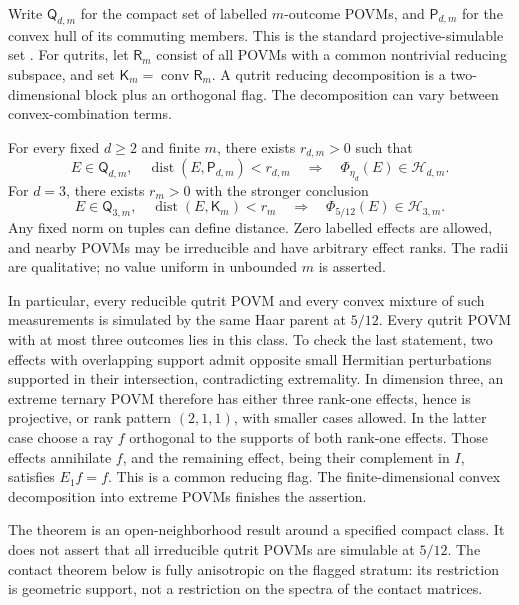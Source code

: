 Write \(\mathsf Q_{d,m}\) for the compact set of labelled \(m\)-outcome
POVMs, and \(\mathsf P_{d,m}\) for the convex hull of its commuting
members. This is the standard projective-simulable set
\cite{geo_oszmaniec2017}.
For qutrits, let \(\mathsf R_m\) consist of all POVMs with a common
nontrivial reducing subspace, and set
\(\mathsf K_m=\operatorname{conv}\mathsf R_m\). A qutrit reducing
decomposition is a two-dimensional block plus an orthogonal flag.
The decomposition can vary between convex-combination terms.

\begin{theorem}
\label{geo:operational}
For every fixed \(d\ge2\) and finite \(m\), there exists \(r_{d,m}>0\)
such that
\[
 E\in\mathsf Q_{d,m},\quad
 \operatorname{dist}(E,\mathsf P_{d,m})<r_{d,m}
 \quad\Longrightarrow\quad
 \Phi_{\eta_d}(E)\in\mathcal H_{d,m}.
 \tag{i}
\]
For \(d=3\), there exists \(r_m>0\) with the stronger conclusion
\[
 E\in\mathsf Q_{3,m},\quad
 \operatorname{dist}(E,\mathsf K_m)<r_m
 \quad\Longrightarrow\quad
 \Phi_{5/12}(E)\in\mathcal H_{3,m}.
 \tag{ii}
\]
Any fixed norm on tuples can define distance. Zero labelled effects
are allowed, and nearby POVMs may be irreducible and have arbitrary
effect ranks. The radii are qualitative; no value uniform in
unbounded \(m\) is asserted.
\end{theorem}

In particular, every reducible qutrit POVM and every convex mixture of
such measurements is simulated by the same Haar parent at \(5/12\).
Every qutrit POVM with at most three outcomes lies in this class.
To check the last statement, two effects with overlapping support
admit opposite small Hermitian perturbations supported in their
intersection, contradicting extremality. In dimension three, an
extreme ternary POVM therefore has either three rank-one effects,
hence is projective, or rank pattern \((2,1,1)\), with smaller cases
allowed. In the latter case choose a ray \(f\) orthogonal to the
supports of both rank-one effects. Those effects annihilate \(f\),
and the remaining effect, being their complement in \(I\), satisfies
\(E_1f=f\). This is a common reducing flag. The finite-dimensional
convex decomposition into extreme POVMs finishes the assertion.

\begin{remark}
The theorem is an open-neighborhood result around a specified compact
class. It does not assert that all irreducible qutrit POVMs are
simulable at \(5/12\). The contact theorem below is fully anisotropic
on the flagged stratum: its restriction is geometric support, not a
restriction on the spectra of the contact matrices.
\end{remark}

